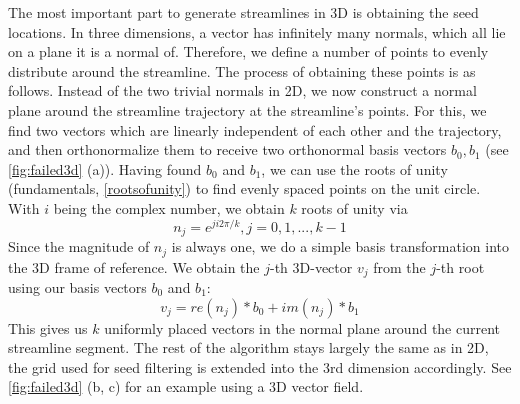 The most important part to generate streamlines in 3D is obtaining the seed locations.
In three dimensions, a vector has infinitely many normals, which all lie on a plane it is a normal of.
Therefore, we define a number of points to evenly distribute around the streamline.
The process of obtaining these points is as follows.
Instead of the two trivial normals in 2D, we now construct a normal plane around the streamline trajectory at the streamline's points.
For this, we find two vectors which are linearly independent of each other and the trajectory,
and then orthonormalize them to receive two orthonormal basis vectors $b_0, b_1$ (see \cref{fig:failed3d} (a)).
Having found $b_0$ and $b_1$, we can use the roots of unity (fundamentals, \cref{rootsofunity}) to find evenly spaced points on the unit circle.
With $i$ being the complex number, we obtain $k$ roots of unity via 
\[n_j = e^{ji2\pi/k}, j = 0, 1, ..., k-1\]
Since the magnitude of $n_j$ is always one, we do a simple basis transformation into the 3D frame of reference.
We obtain the $j$-th 3D-vector $v_j$ from the $j$-th root using our basis vectors $b_0$ and $b_1$:
\[v_j = re(n_j)*b_0 + im(n_j)*b_1 \]
This gives us $k$ uniformly placed vectors in the normal plane around the current streamline segment.
The rest of the algorithm stays largely the same as in 2D, the grid used for seed filtering is extended into the 3rd dimension accordingly.
See \cref{fig:failed3d} (b, c) for an example using a 3D vector field.
\newpage
\begin{figure}[ht]
    \centering
    
\end{figure}
